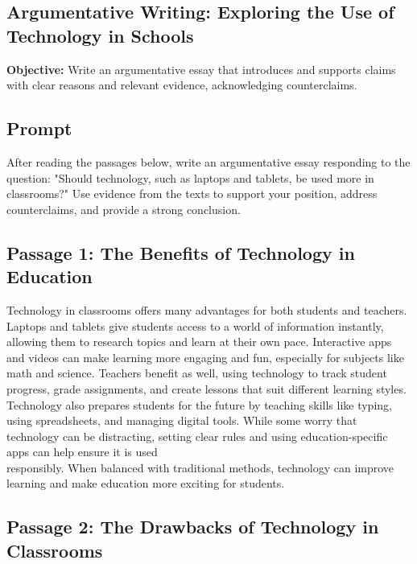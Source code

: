 \documentclass[12pt]{article}
\begin{document}
\subsection*{Argumentative Writing: Exploring the Use of Technology in Schools}
\onehalfspacing

\begin{tcolorbox}[colframe=black!40, colback=gray!0, title=Learning Objective]
\textbf{Objective:} Write an argumentative essay that introduces and supports claims with clear reasons and relevant evidence, acknowledging counterclaims.
\end{tcolorbox}

\subsection*{Prompt}

After reading the passages below, write an argumentative essay responding to the question:  
"Should technology, such as laptops and tablets, be used more in \\classrooms?"  
Use evidence from the texts to support your position, address \\counterclaims, and provide a strong conclusion.

\subsection*{Passage 1: The Benefits of Technology in Education}

Technology in classrooms offers many advantages for both students and teachers. Laptops and tablets give students access to a world of information instantly, allowing them to research topics and learn at their own pace. Interactive apps and videos can make learning more engaging and fun, especially for subjects like math and science. Teachers benefit as well, using technology to track student progress, grade assignments, and create lessons that suit different learning styles. Technology also prepares students for the future by teaching skills like typing, using spreadsheets, and managing digital tools. While some worry that technology can be distracting, setting clear rules and using education-specific apps can help ensure it is used \\responsibly. When balanced with traditional methods, technology can improve \\learning and make education more exciting for students.

\subsection*{Passage 2: The Drawbacks of Technology in Classrooms}
\end{document}
